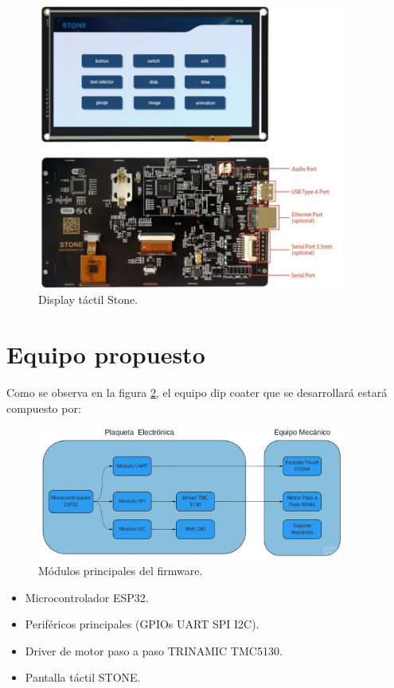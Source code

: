\begin{figure}[h]
\centering 
\includegraphics[width=0.9\textwidth]{./Figures/stone.png}
\caption{Display táctil Stone.}
\label{fig:equipo}
\end{figure}


\section{Equipo propuesto}

Como se observa en la figura \ref{fig:equipo}, el equipo dip coater que se desarrollará estará compuesto por: 

\begin{figure}[h]
\centering 
\includegraphics[width=0.9\textwidth]{./Figures/equipo.png}
\caption{Módulos principales del firmware.}
\label{fig:equipo}
\end{figure}
\vspace{25px}


\begin{itemize}
\item Microcontrolador ESP32. 
\item Periféricos principales (GPIOs UART SPI I2C). 
\item Driver de motor paso a paso TRINAMIC  TMC5130.
\item Pantalla táctil STONE. 
\end{itemize}



